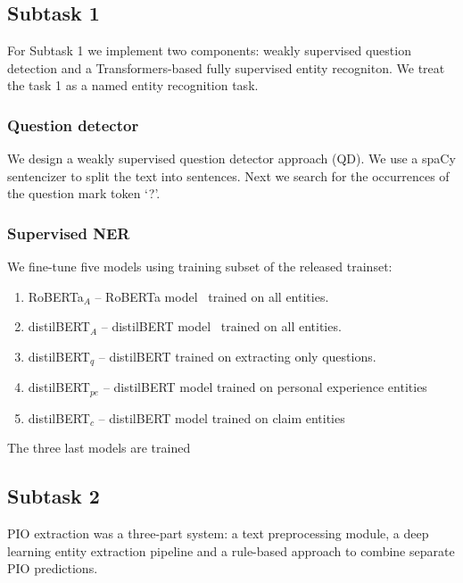 \documentclass[11pt]{article}
\begin{document}
\subsection{Subtask 1} \label{sec:system1}
\label{subsec:syst_task1}
%
For Subtask 1 we implement two components: weakly supervised question detection and a Transformers-based fully supervised entity recogniton.
We treat the task 1 as a named entity recognition task.

\subsubsection*{Question detector}


We design a weakly supervised question detector approach (QD).
We use a spaCy sentencizer to split the text into sentences.
Next we search for the occurrences of the question mark token `?'. 



\subsubsection*{Supervised NER}


We fine-tune five models using training subset of the released trainset:

\begin{enumerate}
\item RoBERTa$_A$ -- RoBERTa model~\cite{Liu2019RoBERTaAR} trained on all entities. %
\item distilBERT$_A$ -- distilBERT model~\cite{Sanh2019DistilBERTAD} trained on all entities.  %
\item  distilBERT$_q$ --  distilBERT trained on extracting only questions. %
\item distilBERT$_{pe}$ -- distilBERT model trained on personal experience entities %
\item distilBERT$_c$ -- distilBERT model trained on claim entities %
\end{enumerate}

The three last models are trained 



%
%
%
\subsection{Subtask 2}
\label{system:task2}
%
PIO extraction was a three-part system: a text preprocessing module, a deep learning entity extraction pipeline and a rule-based approach to combine separate PIO predictions.
%
%
%
\end{document}
